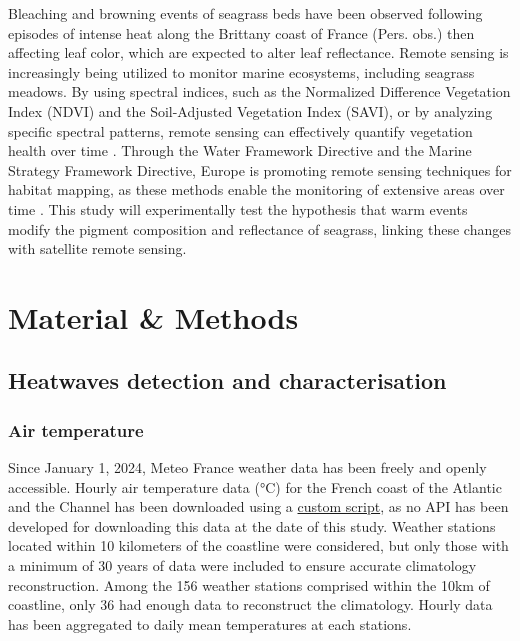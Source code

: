 \documentclass[
  number]{elsarticle}
\begin{document}
Bleaching and browning events of seagrass beds have been observed
following episodes of intense heat along the Brittany coast of France
(Pers. obs.) then affecting leaf color, which are expected to alter leaf
reflectance. Remote sensing is increasingly being utilized to monitor
marine ecosystems, including seagrass meadows. By using spectral
indices, such as the Normalized Difference Vegetation Index (NDVI) and
the Soil-Adjusted Vegetation Index (SAVI), or by analyzing specific
spectral patterns, remote sensing can effectively quantify vegetation
health over time
\citep{huete2012vegetation, kloos2021agricultural, carlan2020identifying, akbar2020mangrove}.
Through the Water Framework Directive and the Marine Strategy Framework
Directive, Europe is promoting remote sensing techniques for habitat
mapping, as these methods enable the monitoring of extensive areas over
time \citep{papathanasopoulou2019satellite}. This study will
experimentally test the hypothesis that warm events modify the pigment
composition and reflectance of seagrass, linking these changes with
satellite remote sensing.

\section{Material \& Methods}\label{material-methods}

\subsection{Heatwaves detection and
characterisation}\label{heatwaves-detection-and-characterisation}

\subsubsection{Air temperature}\label{air-temperature}

Since January 1, 2024, Meteo France weather data has been freely and
openly accessible. Hourly air temperature data (°C) for the French coast
of the Atlantic and the Channel has been downloaded using a
\href{https://github.com/SigOiry/HeatWave_Seagrasses/blob/main/MeteoFrance_Extraction.qmd}{custom
script}, as no API has been developed for downloading this data at the
date of this study. Weather stations located within 10 kilometers of the
coastline were considered, but only those with a minimum of 30 years of
data were included to ensure accurate climatology reconstruction. Among
the 156 weather stations comprised within the 10km of coastline, only 36
had enough data to reconstruct the climatology. Hourly data has been
aggregated to daily mean temperatures at each stations.
\end{document}
